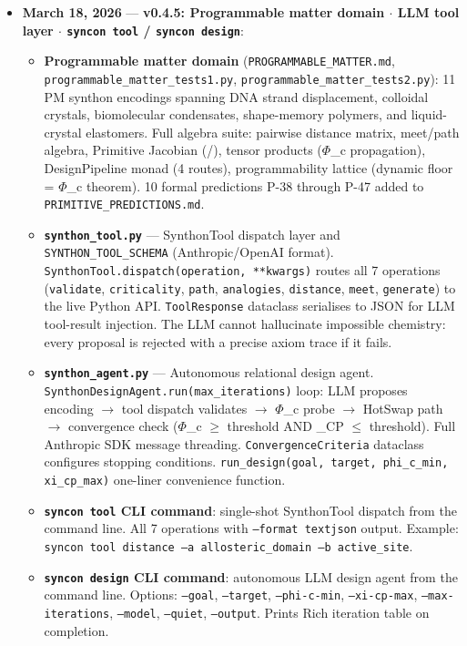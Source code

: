 \documentclass[12pt,a4paper]{article}
\begin{document}
\begin{itemize}
    \item 
    \textbf{March 18, 2026} --- \textbf{v0.4.5: Programmable matter domain $\cdot$ LLM tool layer $\cdot$ \texttt{syncon tool} / \texttt{syncon design}}:

    \begin{itemize}
    \item \textbf{Programmable matter domain} (\texttt{PROGRAMMABLE\_MATTER.md}, \texttt{programmable\_matter\_tests1.py}, \texttt{programmable\_matter\_tests2.py}): 11 PM synthon encodings spanning DNA strand displacement, colloidal crystals, biomolecular condensates, shape-memory polymers, and liquid-crystal elastomers. Full algebra suite: pairwise distance matrix, meet/path algebra, Primitive Jacobian (\partiald/\partialprimitive), tensor products ($\Phi$\_c propagation), DesignPipeline monad (4 routes), programmability lattice (dynamic floor = $\Phi$\_c theorem). 10 formal predictions P-38 through P-47 added to \texttt{PRIMITIVE\_PREDICTIONS.md}.
    \item \textbf{\texttt{synthon\_tool.py}} --- SynthonTool dispatch layer and \texttt{SYNTHON\_TOOL\_SCHEMA} (Anthropic/OpenAI format). \texttt{SynthonTool.dispatch(operation, **kwargs)} routes all 7 operations (\texttt{validate}, \texttt{criticality}, \texttt{path}, \texttt{analogies}, \texttt{distance}, \texttt{meet}, \texttt{generate}) to the live Python API. \texttt{ToolResponse} dataclass serialises to JSON for LLM tool-result injection. The LLM cannot hallucinate impossible chemistry: every proposal is rejected with a precise axiom trace if it fails.
    \item \textbf{\texttt{synthon\_agent.py}} --- Autonomous relational design agent. \texttt{SynthonDesignAgent.run(max\_iterations)} loop: LLM proposes encoding $\rightarrow$ tool dispatch validates $\rightarrow$ $\Phi$\_c probe $\rightarrow$ HotSwap path $\rightarrow$ convergence check ($\Phi$\_c $\geq$ threshold AND \xi\_CP $\leq$ threshold). Full Anthropic SDK message threading. \texttt{ConvergenceCriteria} dataclass configures stopping conditions. \texttt{run\_design(goal, target, phi\_c\_min, xi\_cp\_max)} one-liner convenience function.
    \item \textbf{\texttt{syncon tool} CLI command}: single-shot SynthonTool dispatch from the command line. All 7 operations with \texttt{--format text\textbar{}json} output. Example: \texttt{syncon tool distance --a allosteric\_domain --b active\_site}.
    \item \textbf{\texttt{syncon design} CLI command}: autonomous LLM design agent from the command line. Options: \texttt{--goal}, \texttt{--target}, \texttt{--phi-c-min}, \texttt{--xi-cp-max}, \texttt{--max-iterations}, \texttt{--model}, \texttt{--quiet}, \texttt{--output}. Prints Rich iteration table on completion.

\end{itemize}
\end{itemize}
\end{document}
